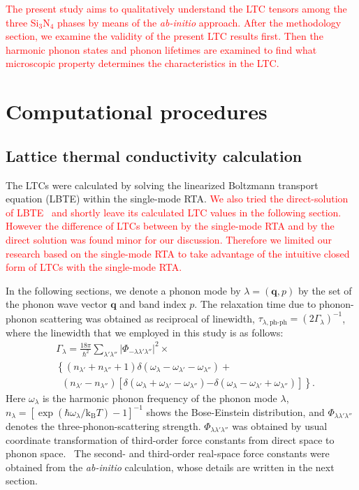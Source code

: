 \documentclass[twocolumn,amsmath,amssymb,a4paper,prb,superscriptaddress,floatfix]{revtex4-1}
\begin{document}
\textcolor{red}{The present study aims to qualitatively understand the
LTC tensors among the three Si$_3$N$_4$ phases by means of the {\it
ab-initio} approach. After the methodology
section, we examine the validity of the present LTC results first. Then
the harmonic phonon states and phonon lifetimes
are examined to find what microscopic property determines the characteristics in the LTC.}

\section{Computational procedures}
\subsection{Lattice thermal conductivity calculation}
The LTCs were calculated by solving the linearized Boltzmann
transport equation (LBTE) within the single-mode RTA.
%
\textcolor{red}{We also tried the direct-solution of LBTE~\cite{chaput-direct} and shortly
leave its calculated LTC values in the following section. However the
difference of LTCs between by the single-mode RTA and by the direct
solution was found minor for our discussion. Therefore we limited our
research based on the single-mode RTA to take advantage of the intuitive
closed form of LTCs with the single-mode RTA.}

In the following sections, we denote a phonon mode by
$\lambda=(\mathbf{q},p)$ by the set of the phonon wave vector
$\mathbf{q}$ and band index $p$. The relaxation time due to
phonon-phonon scattering was obtained as reciprocal of linewidth,
$\tau_{\lambda,\text{ph-ph}}=(2\Gamma_\lambda)^{-1}$, where the
linewidth that we employed in this study is as follows:
\begin{align}
 \label{eq:linewidth}
 &\Gamma_\lambda = \frac{18\pi}{\hbar^2}
  \sum_{\lambda' \lambda''}
  \bigl|\Phi_{-\lambda\lambda'\lambda''}\bigl|^2 \times \nonumber \\ 
 &\left\{ (n_{\lambda'} + n_{\lambda''}+1) 
   \delta(\omega_\lambda-\omega_{\lambda'}-\omega_{\lambda''}) \right.
   + \nonumber \\ 
 &\;\;(n_{\lambda'}-n_{\lambda''})
  \left[\delta(\omega_\lambda +\omega_{\lambda'}-\omega_{\lambda''})
 \right. 
 \left. -\left. \delta(\omega_\lambda - \omega_{\lambda'}+\omega_{\lambda''})
 \right]\right\}.
\end{align}
Here $\omega_\lambda$ is the harmonic phonon frequency of the phonon
mode $\lambda$,
$n_\lambda=[\exp(\hbar\omega_\lambda/\mathrm{k_B}T)-1]^{-1}$ shows the
Bose-Einstein distribution, and $\Phi_{\lambda\lambda'\lambda''}$
denotes the three-phonon-scattering
strength. $\Phi_{\lambda\lambda'\lambda''}$ was obtained by usual
coordinate transformation of third-order force constants from direct
space to phonon space.~\cite{phono3py} The second- and third-order real-space force
constants were obtained from the {\it ab-initio} calculation, whose
details are written in the next section.
\end{document}
